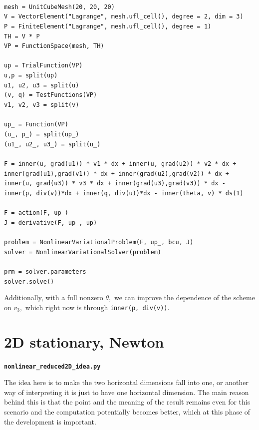 \documentclass[11pt]{article}
\begin{document}
\texttt{
\\
mesh = UnitCubeMesh(20, 20, 20) \\
V = VectorElement("Lagrange", mesh.ufl\_cell(), degree = 2, dim = 3) \\
P = FiniteElement("Lagrange", mesh.ufl\_cell(), degree = 1) \\
TH = V * P \\
VP = FunctionSpace(mesh, TH)\\
\\
up = TrialFunction(VP)\\
u,p = split(up)\\
u1, u2, u3 = split(u)\\
(v, q) = TestFunctions(VP)\\
v1, v2, v3 = split(v)\\
\\
up\_ = Function(VP)\\
(u\_, p\_) = split(up\_)\\
(u1\_, u2\_, u3\_) = split(u\_)\\
\\
F = inner(u, grad(u1)) * v1 * dx + inner(u, grad(u2)) * v2 * dx + inner(grad(u1),grad(v1)) * dx + inner(grad(u2),grad(v2)) * dx + inner(u, grad(u3)) * v3 * dx + inner(grad(u3),grad(v3)) * dx - inner(p, div(v))*dx + inner(q, div(u))*dx - inner(theta, v) * ds(1)\\
\\
F = action(F, up\_)\\
J  = derivative(F, up\_, up)\\
\\
problem = NonlinearVariationalProblem(F, up\_, bcu, J)\\
solver  = NonlinearVariationalSolver(problem)\\
\\
prm = solver.parameters\\
solver.solve()\\
}

Additionally, with a full nonzero $\theta,$ we can improve the dependence of the scheme on $v_3,$ which right now is through \texttt{inner(p, div(v))}.

\section{2D stationary, Newton}

\textbf{\texttt{nonlinear\_reduced2D\_idea.py}}

The idea here is to make the two horizontal dimensions fall into one, or another way of interpreting it is just to have one horizontal dimension. The main reason behind this is that the point and the meaning of the result remains even for this scenario and the computation potentially becomes better, which at this phase of the development is important.
\end{document}
